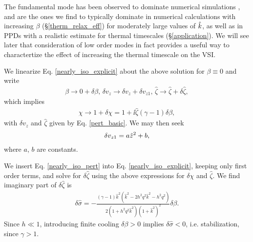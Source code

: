 The fundamental mode has been observed to dominate numerical simulations
\citep[]{stoll14}, and are the ones we find to typically 
dominate in numerical calculations with increasing $\beta$
(\S\ref{therm_relax_eff}) for moderately large    
values of $\hat{k}$, as well as in PPDs 
with a realistic estimate for thermal timescales
(\S\ref{application}). We will see later that consideration of low
order modes in fact provides a useful way to charactertize the effect
of increasing the thermal timescale on the VSI. 

We linearize Eq. \ref{nearly_iso_explicit} about the above
solution for $\beta\equiv0$ and write 
\begin{align}\label{nearly_iso_pert}
  \beta \to 0 + \delta\beta,\, \delta v_z\to \delta v_z+\delta
  v_{z1},\,\hat{\zeta} \to \hat{\zeta} + \delta\hat{\zeta}, 
\end{align}
which implies 
\begin{align}
  \chi \to 1 + \delta\chi = 1 + \ii \hat{\zeta}\left(\gamma-1\right)\delta\beta,
\end{align}
with $\delta v_z$ and $\hat{\zeta}$ given by Eq. \ref{pert_basic}. We
may then seek  
\begin{align}
  \delta v_{z1} = a \hat{z}^2 + b,
\end{align}
where $a$, $b$ are constants. 

We insert Eq. \ref{nearly_iso_pert} into
Eq. \ref{nearly_iso_explicit}, keeping only first order terms, and
solve for $\delta\hat{\zeta}$ using the above expressions for $\delta\chi$
and $\hat{\zeta}$. We find imaginary part of $\delta\hat{\zeta}$
is 
\begin{align}
  \delta\hat{\sigma} =
  -\frac{\left(\gamma-1\right)\hat{k}^2 \left(\hat{k}^2 -
      2h^2q^2\hat{k}^2 - h^2q^2\right)}{2\left(1+h^2 q^2
      \hat{k}^2\right)\left(1+\hat{k}^2\right)^2}\delta\beta.  
\end{align}
Since $h \ll 1$, introducing finite cooling $\delta\beta>0$
implies $\delta\hat{\sigma} < 0$, i.e. stabilization, since $\gamma>1$. 

